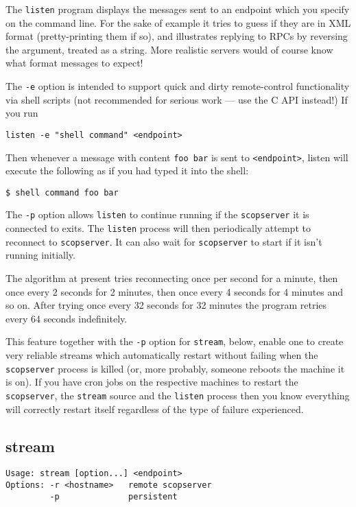 \documentclass[12pt,a4paper,twoside]{article}
\renewcommand{\_}{\texttt{\symbol{95}}}
\begin{document}
The \texttt{listen} program displays the messages sent to an
endpoint which you specify on the command line.
For the sake of example it tries to guess if they are in XML
format (pretty-printing them if so), and illustrates
replying to RPCs by reversing the argument, treated as a
string. More realistic servers would of course know what
format messages to expect!

The \texttt{-e} option is intended to support quick and dirty
remote-control functionality via shell scripts (not recommended
for serious work --- use the C API instead!) If you run

\verb=listen -e "shell command" <endpoint>=

Then whenever a message with content \verb=foo bar= is sent to
\texttt{<endpoint>}, listen will execute the following as if
you had typed it into the shell:

\verb=$ shell command foo bar=

The \texttt{-p} option allows \texttt{listen} to continue running if the
\texttt{scopserver} it is connected to exits. The \texttt{listen} process will
then periodically attempt to reconnect to \texttt{scopserver}. It can also wait
for \texttt{scopserver} to start if it isn't running initially.

The algorithm at present tries reconnecting once per second for a
minute, then once every 2 seconds for 2 minutes, then once every
4 seconds for 4 minutes and so on. After trying once every 32
seconds for 32 minutes the program retries every 64 seconds indefinitely.

This feature together with the \texttt{-p} option for \texttt{stream}, below,
enable one to create very reliable streams which automatically restart without
failing when the \texttt{scopserver} process is killed (or, more probably,
someone reboots the machine it is on). If you have cron jobs on the respective
machines to restart the \texttt{scopserver}, the \texttt{stream} source and the
\texttt{listen} process then you know everything will correctly restart itself
regardless of the type of failure experienced.

\subsection{stream}

\begin{verbatim}
Usage: stream [option...] <endpoint>
Options: -r <hostname>   remote scopserver
         -p              persistent
\end{verbatim}
\end{document}
